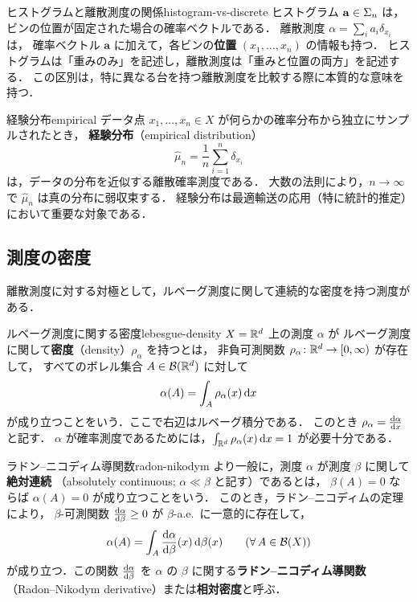 \begin{remark}{ヒストグラムと離散測度の関係}{histogram-vs-discrete}
  ヒストグラム $\mathbf{a} \in \Sigma_n$ は，ビンの位置が固定された場合の確率ベクトルである．
  離散測度 $\alpha = \sum_i a_i \delta_{x_i}$ は，
  確率ベクトル $\mathbf{a}$ に加えて，各ビンの\textbf{位置} $(x_1, \ldots, x_n)$ の情報も持つ．
  ヒストグラムは「重みのみ」を記述し，離散測度は「重みと位置の両方」を記述する．
  この区別は，特に異なる台を持つ離散測度を比較する際に本質的な意味を持つ．
\end{remark}

\begin{example}{経験分布}{empirical}
  データ点 $x_1, \ldots, x_n \in X$ が何らかの確率分布から独立にサンプルされたとき，
  \textbf{経験分布}（empirical distribution）
  \[
    \hat{\mu}_n = \frac{1}{n} \sum_{i=1}^n \delta_{x_i}
  \]
  は，データの分布を近似する離散確率測度である．
  大数の法則により，$n \to \infty$ で $\hat{\mu}_n$ は真の分布に弱収束する．
  経験分布は最適輸送の応用（特に統計的推定）において重要な対象である．
\end{example}

\subsection{測度の密度}
\label{subsec:density}

離散測度に対する対極として，ルベーグ測度に関して連続的な密度を持つ測度がある．

\begin{definition}{ルベーグ測度に関する密度}{lebesgue-density}
  $X = \mathbb{R}^d$ 上の測度 $\alpha$ が
  ルベーグ測度に関して\textbf{密度}（density）$\rho_\alpha$ を持つとは，
  非負可測関数 $\rho_\alpha \colon \mathbb{R}^d \to [0, \infty)$ が存在して，
  すべてのボレル集合 $A \in \mathcal{B}(\mathbb{R}^d)$ に対して
  \[
    \alpha(A) = \int_A \rho_\alpha(x) \, \mathrm{d} x
  \]
  が成り立つことをいう．ここで右辺はルベーグ積分である．
  このとき $\rho_\alpha = \frac{\mathrm{d}\alpha}{\mathrm{d} x}$ と記す．
  $\alpha$ が確率測度であるためには，$\int_{\mathbb{R}^d} \rho_\alpha(x) \, \mathrm{d} x = 1$ が必要十分である．
\end{definition}

\begin{definition}{ラドン--ニコディム導関数}{radon-nikodym}
  より一般に，測度 $\alpha$ が測度 $\beta$ に関して\textbf{絶対連続}
  （absolutely continuous; $\alpha \ll \beta$ と記す）であるとは，
  $\beta(A) = 0$ ならば $\alpha(A) = 0$ が成り立つことをいう．
  このとき，ラドン--ニコディムの定理により，
  $\beta$-可測関数 $\frac{\mathrm{d}\alpha}{\mathrm{d}\beta} \geq 0$ が $\beta$-a.e.\ に一意的に存在して，
  \[
    \alpha(A) = \int_A \frac{\mathrm{d}\alpha}{\mathrm{d}\beta}(x) \, \mathrm{d}\beta(x)
    \qquad (\forall\, A \in \mathcal{B}(X))
  \]
  が成り立つ．この関数 $\frac{\mathrm{d}\alpha}{\mathrm{d}\beta}$ を
  $\alpha$ の $\beta$ に関する\textbf{ラドン--ニコディム導関数}
  （Radon--Nikodym derivative）または\textbf{相対密度}と呼ぶ．
\end{definition}

